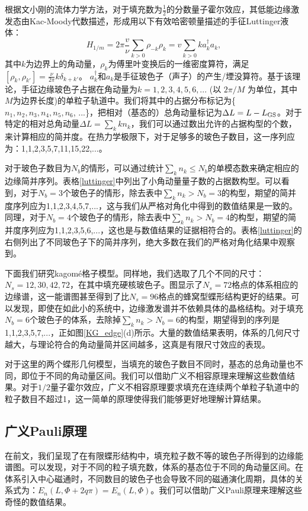 根据文小刚的流体力学方法，对于填充数为$\frac{1}{2}$的分数量子霍尔效应，其低能边缘激发态由Kac-Moody代数描述，形成用以下有效哈密顿量描述的手征Luttinger液体：
\begin{equation}\label{eq:Wen}
   H_{1/m}=2\pi \frac{v}{\nu}\displaystyle\sum_{k>0}\rho_{-k}\rho_k=v\sum_{k>0} k a^{\dagger}_k a_k,
\end{equation}
其中$k$为边界上的角动量，$\rho_k$为傅里叶变换后的一维密度算符，满足$[\rho_k,\rho_{k'}]=\frac{\nu}{2\pi}k\delta_{k+k'}$。 $a^{\dagger}_k$和$a_k$是手征玻色子（声子）的产生/堙没算符。基于该理论，手征边缘玻色子占据在角动量为$k=1, 2, 3, 4, 5, 6, ...$ (以 $2\pi/M$ 为单位，其中$M$为边界长度)的单粒子轨道中。我们将其中的占据分布标记为\{$n_1,n_2,n_3,n_4,n_5,n_6$, ...\}，把相对（基态的）总角动量标记为$\Delta L = L - L_{\rm GS}$。对于特定的相对总角动量$\Delta L = \sum_{k} kn_{k}$，我们可以通过数出允许的占据构型的个数，来计算相应的简并度。在热力学极限下，对于足够多的玻色子数目，这一序列应为：1,1,2,3,5,7,11,15,22,...。

对于玻色子数目为$N_b$的情形，可以通过统计$\sum_k n_k\le N_b$的单模态数来确定相应的边缘简并序列。表格\ref{luttinger}中列出了小角动量量子数的占据数构型。可以看到，对于$N_b=3$个玻色子的情形，除去表中$\sum_k n_k>N_b=3$的构型，期望的简并度序列应为1,1,2,3,4,5,7,...，这与我们从严格对角化中得到的数值结果是一致的。同理，对于$N_b=4$个玻色子的情形，除去表中$\sum_k n_k>N_b=4$的构型，期望的简并度序列应为1,1,2,3,5,6,...，这也是与数值结果的证据相符合的。表格\ref{luttinger}的右侧列出了不同玻色子下的简并序列，绝大多数在我们的严格对角化结果中观察到。

下面我们研究kagom\'{e}格子模型。同样地，我们选取了几个不同的尺寸：$N_s =12, 30, 42, 72$，在其中填充硬核玻色子。图显示了$N_s=72$格点的体系相应的边缘谱，这一能谱图甚至得到了比$N_s=96$格点的蜂窝型蝶形结构更好的结果。可以发现，即使在如此小的系统中，边缘激发谱并不依赖具体的晶格结构。对于填充$N_b=6$个玻色子的体系，去除掉$\sum_k n_k > N_b=6$的构型，期望得到的序列是1,1,2,3,5,7,...，正如图\ref{KG_edge}(d)所示。大量的数值结果表明，体系的几何尺寸越大，与理论符合的角动量简并区间越多，这真是有限尺寸效应的表现。

对于这里的两个蝶形几何模型，当填充的玻色子数目不同时，基态的总角动量也不同，即位于不同的角动量区间。我们可以借助广义不相容原理来理解这些数值结果。对于$1/2$量子霍尔效应，广义不相容原理要求填充在连续两个单粒子轨道中的粒子数目不超过1，这一简单的原理使得我们能够更好地理解计算结果。


\subsection{广义Pauli原理}
在前文，我们呈现了在有限蝶形结构中，填充粒子数不等的玻色子所得到的边缘能谱图。可以发现，对于不同的粒子填充数，体系的基态位于不同的角动量区间。在体系引入中心磁通时，不同数目的玻色子也会导致不同的磁通演化周期，具体的关系式为：$E_n(L,\Phi+2q\pi)=E_n(L,\Phi)$。我们可以借助广义Pauli原理来理解这些奇怪的数值结果。


